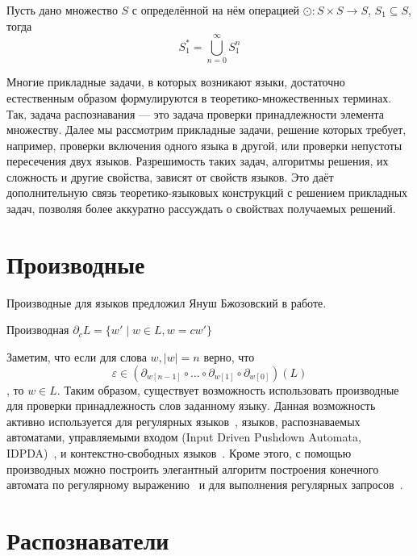 \begin{definition}
Пусть дано множество $S$ с определённой на нём операцией $\odot: S \times S \to S$, $S_1 \subseteq S$, тогда 
$$
S_1 ^ * = \bigcup_{n = 0}^{\infty} S_1^n
$$
\end{definition}

Многие прикладные задачи, в которых возникают языки, достаточно естественным образом формулируются в теоретико-множественных терминах.
Так, задача распознавания --- это задача проверки принадлежности элемента множеству.
Далее мы рассмотрим прикладные задачи, решение которых требует, например, проверки включения одного языка в другой, или проверки непустоты пересечения двух языков.
Разрешимость таких задач, алгоритмы решения, их сложность и другие свойства, зависят от свойств языков. 
Это даёт дополнительную связь теоретико-языковых конструкций с решением прикладных задач, позволяя более аккуратно рассуждать о свойствах получаемых решений.

\section{Производные}

Производные для языков предложил Януш Бжозовский в работе\cite{10.1145/321239.321249}.

\begin{definition}
  Производная $\partial_c L = \{ w' \mid w \in L, w = cw'\}$
\end{definition}

Заметим, что если для слова $w, |w|=n$ верно, что $$\varepsilon \in (\partial_{w[n-1]} \circ \ldots \circ \partial_{w[1]}  \circ \partial_{w[0]}) (L)$$, то $w \in L$.
Таким образом, существует возможность использовать производные для проверки принадлежность слов заданному языку. 
Данная возможность активно используется для регулярных языков~\cite{caron_champarnaud_mignot_2014}, языков, распознаваемых автоматами, управляемыми входом (Input Driven Pushdown Automata, IDPDA)~\cite{10.1145/3591472}, и контекстно-свободных языков~\cite{10.1145/2034773.2034801, 10.1145/3022671.2984026}.
Кроме этого, с помощью производных можно построить элегантный алгоритм построения конечного автомата по регулярному выражению~\cite{10.1017/S0956796808007090} и для выполнения регулярных запросов~\cite{10.1145/2949689.2949711}.


\section{Распознаватели}

